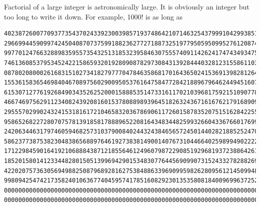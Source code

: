 \begin{example}\label{ex:factorial}
Factorial of a large integer is astronomically large.  It is obviously an integer but too long to write it down.  For example, 1000! is as long as
\tiny
\begin{mybox}
\begin{verbatim}
4023872600770937735437024339230039857193748642107146325437999104299385123986290205920442084869694048004799886101971960586316668729948085589013238
2966994459099742450408707375991882362772718873251977950595099527612087497546249704360141827809464649629105639388743788648733711918104582578364784
9977012476632889835955735432513185323958463075557409114262417474349347553428646576611667797396668820291207379143853719588249808126867838374559731
7461360853795345242215865932019280908782973084313928444032812315586110369768013573042161687476096758713483120254785893207671691324484262361314125
0878020800026168315102734182797770478463586817016436502415369139828126481021309276124489635992870511496497541990934222156683257208082133318611681
1553615836546984046708975602900950537616475847728421889679646244945160765353408198901385442487984959953319101723355556602139450399736280750137837
6153071277619268490343526252000158885351473316117021039681759215109077880193931781141945452572238655414610628921879602238389714760885062768629671
4667469756291123408243920816015378088989396451826324367161676217916890977991190375403127462228998800519544441428201218736174599264295658174662830
2955570299024324153181617210465832036786906117260158783520751516284225540265170483304226143974286933061690897968482590125458327168226458066526769
9586526822728070757813918581788896522081643483448259932660433676601769996128318607883861502794659551311565520360939881806121385586003014356945272
2420634463179746059468257310379008402443243846565724501440282188525247093519062092902313649327349756551395872055965422874977401141334696271542284
5862377387538230483865688976461927383814900140767310446640259899490222221765904339901886018566526485061799702356193897017860040811889729918311021
1712298459016419210688843871218556461249607987229085192968193723886426148396573822911231250241866493531439701374285319266498753372189406942814341
1852015801412334482801505139969429015348307764456909907315243327828826986460278986432113908350621709500259738986355427719674282224875758676575234
4220207573630569498825087968928162753848863396909959826280956121450994871701244516461260379029309120889086942028510640182154399457156805941872748
9980942547421735824010636774045957417851608292301353580818400969963725242305608559037006242712434169090041536901059339838357779394109700277534720
0000000000000000000000000000000000000000000000000000000000000000000000000000000000000000000000000000000000000000000000000000000000000000000000000
0000000000000000000000000000000000000000000000000000000000000000000000000000000000000000000000000000000
\end{verbatim}
\end{mybox}
\normalsize


\end{example}
